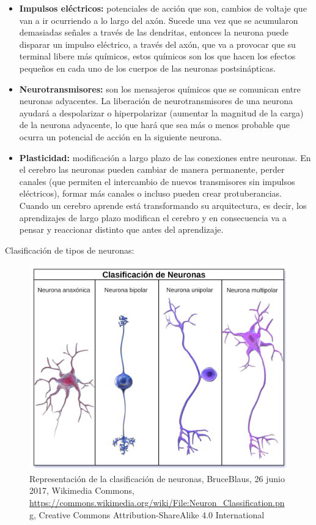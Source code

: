\begin{itemize}
\item \textbf{Impulsos eléctricos:} potenciales de acción que son, cambios de voltaje que van a ir ocurriendo a lo largo del axón. Sucede una vez que se acumularon demasiadas señales a través de las dendritas, entonces la neurona puede disparar un impulso eléctrico, a través del axón, que va a provocar que su terminal libere más químicos, estos químicos son los que hacen los efectos pequeños en cada uno de los cuerpos de las neuronas postsinápticas.

\item \textbf{Neurotransmisores:} son los mensajeros químicos que se comunican entre neuronas adyacentes. La liberación de neurotransmisores de una neurona ayudará a despolarizar o hiperpolarizar (aumentar la magnitud de la carga) de la neurona adyacente, lo que hará que sea más o menos probable que ocurra un potencial de acción en la siguiente neurona.
 
\item \textbf{Plasticidad:} modificación a largo plazo de las conexiones entre neuronas. En el cerebro las neuronas pueden cambiar de manera permanente, perder canales (que permiten el intercambio de nuevos transmisores sin impulsos eléctricos), formar más canales o incluso pueden crear protuberancias. Cuando un cerebro aprende está transformando su arquitectura, es decir, los aprendizajes de largo plazo modifican el cerebro y en consecuencia va a pensar y reaccionar distinto que antes del aprendizaje.
\end{itemize}




Clasificación de tipos de neuronas:


\begin{figure}[h]
 \centering
 \includegraphics[scale=0.15]{../Figuras/tiposDeNeuronas.png}
 \caption{Representación de la clasificación de neuronas, BruceBlaus, 26 junio 2017, Wikimedia Commons, \url{https://commons.wikimedia.org/wiki/File:Neuron_Classification.png}, Creative Commons Attribution-ShareAlike 4.0 International}
 \label{fig:tiposNeuro}
\end{figure}




